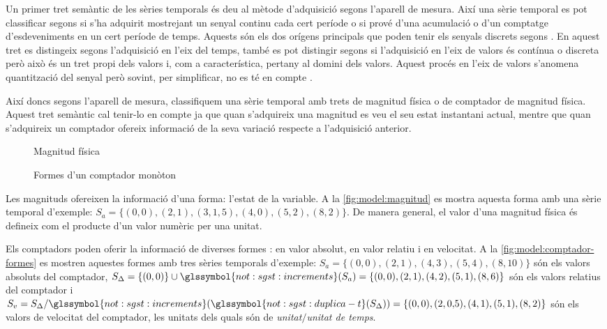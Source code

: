 Un primer tret semàntic de les sèries temporals és deu al mètode
d'adquisició segons l'aparell de mesura. Així una sèrie temporal es
pot classificar segons si s'ha adquirit mostrejant un senyal continu
cada cert període o si prové d'una acumulació o d'un comptatge
d'esdeveniments en un cert període de temps. Aquests són els dos
orígens principals que poden tenir els senyals discrets segons
\textcite[cap.~1]{proakismanolakis96}.  En aquest tret es distingeix
segons l'adquisició en l'eix del temps, també es pot distingir segons
si l'adquisició en l'eix de valors és contínua o discreta però això és
un tret propi dels valors i, com a característica, pertany al domini
dels valors. Aquest procés en l'eix de valors s'anomena quantització
del senyal però sovint, per simplificar, no es té en
compte \parencite{proakismanolakis96}.%



Així doncs segons l'aparell de mesura, classifiquem una sèrie
temporal amb trets de magnitud física o de comptador de magnitud
física. Aquest tret semàntic cal tenir-lo en compte ja que quan
s'adquireix una magnitud es veu el seu estat instantani actual, mentre
que quan s'adquireix un comptador ofereix informació de la seva
variació respecte a l'adquisició anterior.



\begin{figure}[tp]
  \centering
  
  \caption{Magnitud física}
  \label{fig:model:magnitud}
\end{figure}

\begin{figure}[tp]
  \centering
  
  \caption{Formes d'un comptador monòton}
  \label{fig:model:comptador-formes}
\end{figure}



Les magnituds ofereixen la informació d'una forma: l'estat de la
variable. A la \autoref{fig:model:magnitud} es mostra aquesta forma
amb una sèrie temporal d'exemple: $S_a = \{(0,0),(2,1),(3,
1{,}5),(4,0),(5,2),(8,2)\}$. De manera general, el valor d’una
magnitud física és defineix com el producte d’un valor numèric per una
unitat.


Els comptadors poden oferir la informació de diverses formes : en
valor absolut, en valor relatiu i en velocitat. A la
\autoref{fig:model:comptador-formes} es mostren aquestes formes amb
tres sèries temporals d'exemple: $S_a =
\{(0,0),(2,1),(4,3),(5,4),(8,10)\}$ són els valors absoluts del
comptador, $S_\Delta = \{(0,0)\} \cup
\glssymbol{not:sgst:increments}(S_a) =
\{(0,0),(2,1),(4,2),(5,1),(8,6)\}$ són els valors relatius del
comptador i $S_v = S_\Delta /
\glssymbol{not:sgst:increments}(\glssymbol{not:sgst:duplica-t}(S_\Delta))
= \{(0,0),(2,0{,}5),(4,1),(5,1),(8,2)\}$ són els valors de velocitat
del comptador, les unitats dels quals són de \emph{unitat$/$unitat de
  temps}.


